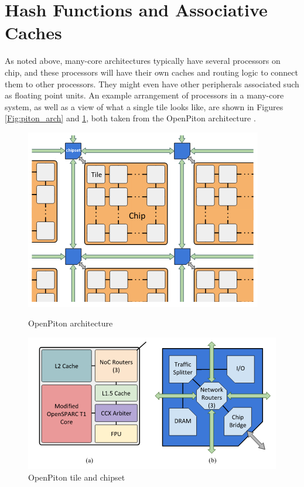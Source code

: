 \section{Hash Functions and Associative Caches}
\label{sec:Problem}

As noted above, many-core architectures typically have several processors on
chip, and these processors will have their own caches and routing logic to
connect them to other processors.  They might even have other peripherals
associated such as floating point units.  An example arrangement of processors
in a many-core system, as well as a view of what a single tile looks like, are
shown in Figures \ref{Fig:piton_arch} and \ref{Fig:piton_tile}, both taken from
the OpenPiton architecture \cite{openpiton}.

\begin{figure}[h]
  \centering
  \begin{minipage}[b]{0.4\textwidth}
    \includegraphics[width=\textwidth]{figures/piton_arch.png}
    \caption{OpenPiton architecture}
    \label{Fig:piton_arch}
  \end{minipage}
  \hfill
  \begin{minipage}[b]{0.4\textwidth}
    \includegraphics[width=\textwidth]{figures/piton_tile_and_chipset.png}
    \caption{OpenPiton tile and chipset}
    \label{Fig:piton_tile}
  \end{minipage}
\end{figure}


